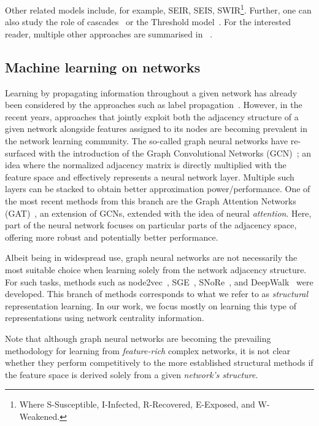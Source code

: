 \documentclass{article}
\begin{document}
Other related models include, for example, SEIR, SEIS, SWIR\footnote{Where S-Susceptible, I-Infected, R-Recovered, E-Exposed, and W-Weakened.}. Further, one can also study the role of cascades~\cite{Kempe2003cascades} or the Threshold model~\cite{Granovetter1979threshold}. For the interested reader, multiple other approaches are summarised in ~\cite{li2017survey}.

\subsection{Machine learning on networks}
\label{sec:learning-graphs}
Learning by propagating information throughout a given network has already been considered by the approaches such as label propagation~\cite{zhu2002learning}. However, in the recent years, approaches that jointly exploit both the adjacency structure of a given network alongside features assigned to its nodes are becoming prevalent in the network learning community. The so-called graph neural networks have re-surfaced with the introduction of the Graph Convolutional Networks (GCN)~\cite{kipf2016semi}; an idea where the normalized adjacency matrix is directly multiplied with the feature space and effectively represents a neural network layer. Multiple such layers can be stacked to obtain better approximation power/performance. One of the most recent methods from this branch are the Graph Attention Networks (GAT)~\cite{velickovic2018graph}, an extension of GCNs, extended with the idea of neural \emph{attention}. Here, part of the neural network focuses on particular parts of the adjacency space, offering more robust and potentially better performance. 

Albeit being in widespread use, graph neural networks are not necessarily the most suitable choice when learning solely from the network adjacency structure. For such tasks, methods such as node2vec~\cite{grover2016node2vec}, SGE~\cite{sge}, SNoRe~\cite{meznar2020snore}, and DeepWalk~\cite{Perozzi2014deepwalk} were developed. This branch of methods corresponds to what we refer to as \emph{structural} representation learning. In our work, we focus mostly on learning this type of representations using network centrality information.

Note that although graph neural networks are becoming the prevailing methodology for learning from \emph{feature-rich} complex networks, it is not clear whether they perform competitively to the more established structural methods if the feature space is derived solely from a given \emph{network's structure}.
\end{document}
